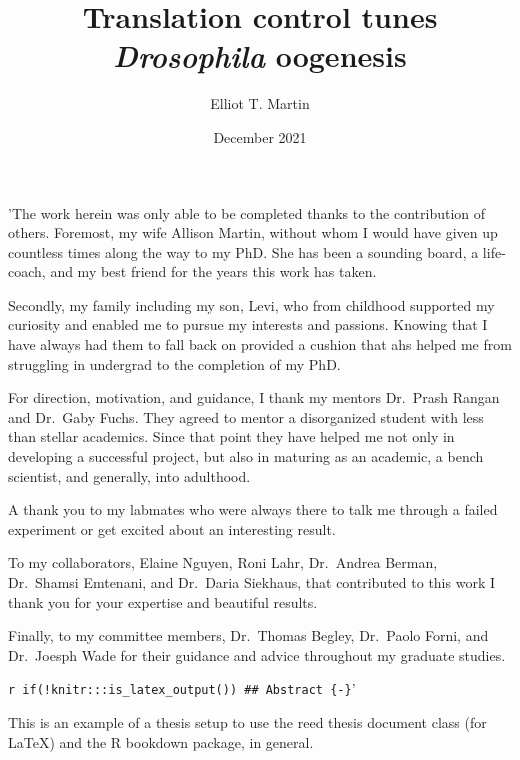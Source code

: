 \documentclass[12pt,oneside]{reedthesis}
\title{Translation control tunes \emph{Drosophila} oogenesis}
\author{Elliot T. Martin}
\date{December 2021}
\begin{document}
  \maketitle

\frontmatter %
\pagestyle{empty} %
  \begin{acknowledgements}
    'The work herein was only able to be completed thanks to the contribution of others.
    Foremost, my wife Allison Martin, without whom I would have given up countless times along the way to my PhD. She
    has been a sounding board, a life-coach, and my best friend for the years this work has taken.

    Secondly, my family including my son, Levi, who from childhood supported my curiosity and enabled me to pursue my interests and passions. Knowing
    that I have always had them to fall back on provided a cushion that ahs helped me from struggling in undergrad to the completion of
    my PhD.

    For direction, motivation, and guidance, I thank my mentors Dr.~Prash Rangan and Dr.~Gaby Fuchs. They agreed to mentor a
    disorganized student with less than stellar academics. Since that point they have helped me not only in developing a
    successful project, but also in maturing as an academic, a bench scientist, and generally, into adulthood.

    A thank you to my labmates who were always there to talk me through a failed experiment or
    get excited about an interesting result.

    To my collaborators, Elaine Nguyen, Roni Lahr, Dr.~Andrea
    Berman, Dr.~Shamsi Emtenani, and Dr.~Daria Siekhaus, that contributed to this work I thank you for your expertise and beautiful results.

    Finally, to my committee members, Dr.~Thomas Begley, Dr.~Paolo Forni, and Dr.~Joesph Wade for their guidance and advice throughout my graduate studies.

    \texttt{r\ if(!knitr:::is\_latex\_output())\ \textquotesingle{}\#\#\ Abstract\ \{-\}\textquotesingle{}}'
  \end{acknowledgements}
  \begin{preface}
    This is an example of a thesis setup to use the reed thesis document class
    (for LaTeX) and the R bookdown package, in general.
  \end{preface}
  \hypersetup{linkcolor=black}
  \setcounter{secnumdepth}{2}
  \setcounter{tocdepth}{2}
  \tableofcontents
\end{document}
